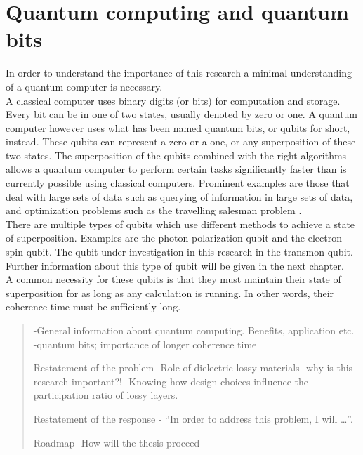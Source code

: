 \section{Quantum computing and quantum bits}
In order to understand the importance of this research a minimal understanding of a quantum computer is necessary. \\
A classical computer uses binary digits (or bits) for computation and storage. Every bit can be in one of two states, usually denoted by zero or one. A quantum computer however uses what has been named quantum bits, or qubits for short, instead. These qubits can represent a zero or a one, or any superposition of these two states. The superposition of the qubits combined with the right algorithms allows a quantum computer to perform certain tasks significantly faster than is currently possible using classical computers. Prominent examples are those that deal with large sets of data such as querying of information in large sets of data, and optimization problems such as the travelling salesman problem \cite{sep-qt-quantcomp}. \\
There are multiple types of qubits which use different methods to achieve a state of superposition. Examples are the photon polarization qubit and the electron spin qubit. The qubit under investigation in this research in the transmon qubit. Further information about this type of qubit will be given in the next chapter. \\
A common necessity for these qubits is that they must maintain their state of superposition for as long as any calculation is running. In other words, their coherence time must be sufficiently long.
\begin{quote}
	-General information about quantum computing. Benefits, application etc.
	-quantum bits; importance of longer coherence time
	
	Restatement of the problem
	-Role of dielectric lossy materials
	-why is this research important?!
	-Knowing how design choices influence the participation ratio of lossy layers.
	
	Restatement of the response
	- “In order to address this problem, I will …”.
	
	Roadmap
	-How will the thesis proceed
\end{quote}



